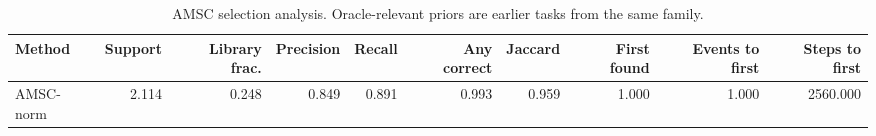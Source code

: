 \begin{table}[ht]
    \caption{AMSC selection analysis. Oracle-relevant priors are earlier tasks from the same family.}
    \label{tbl:amsc_selection}
    \centering
    \scriptsize
    \begin{tabular}{lrrrrrrrrr}
    \toprule
Method & Support & Library frac. & Precision & Recall & Any correct & Jaccard & First found & Events to first & Steps to first \\
    \midrule
AMSC-norm & 2.114 & 0.248 & 0.849 & 0.891 & 0.993 & 0.959 & 1.000 & 1.000 & 2560.000 \\
    \bottomrule
    \end{tabular}
\end{table}
